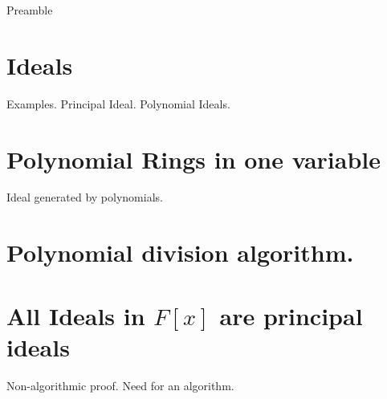 \noindent
Preamble

\section{Ideals}
\newpage

Examples. Principal Ideal. Polynomial Ideals.

\section{Polynomial Rings in one variable}
\newpage \newpage
Ideal generated by polynomials. 

\section{Polynomial division algorithm.}
\newpage \newpage

\section{All Ideals in $F[x]$ are principal ideals}
\newpage \newpage
Non-algorithmic proof. Need for an algorithm.

